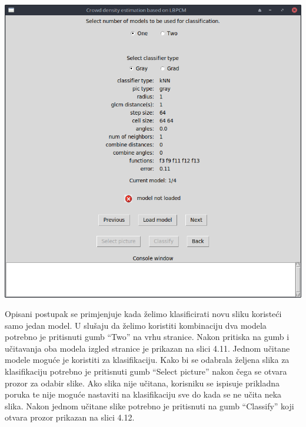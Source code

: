 \documentclass[times, utf8, zavrsni]{fer}
\begin{document}
\begin{minipage}{\linewidth}
\centering
\includegraphics[scale=0.4]{img/cl1.png}
\end{minipage}

\bigbreak

Opisani postupak se primjenjuje kada želimo klasificirati novu sliku
koristeći samo jedan model. U slušaju da želimo koristiti kombinaciju
dva modela potrebno je pritisnuti gumb \enquote{Two} na vrhu stranice.
Nakon pritiska na gumb i učitavanja oba modela izgled stranice je prikazan
na slici 4.11. Jednom učitane modele moguće je koristiti za klasifikaciju. Kako
bi se odabrala željena slika za klasifikaciju potrebno je pritisnuti 
gumb \enquote{Select picture} nakon čega se otvara prozor za odabir slike.
Ako slika nije učitana, korisniku se ispisuje prikladna poruka te nije moguće 
nastaviti na klasifikaciju sve do kada se ne učita neka slika.
Nakon jednom učitane slike potrebno je pritisnuti na gumb \enquote{Classify} koji 
otvara prozor prikazan na slici 4.12.

\bigbreak 
\end{document}
